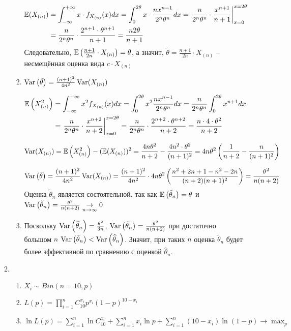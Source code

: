 \begin{enumerate}[resume]
\begin{enumerate}
\begin{enumerate}
\begin{align*}
\operatorname{\mathbb{E}}(X_{(n)}) &= \int_{-\infty}^{+\infty} x \cdot f_{X_{(n)}} (x) dx =  \int_{0}^{2\theta}	x \cdot \frac{nx^{n-1}}{2^n \theta^n} dx = \left. \frac{n}{2^n \theta^n} \cdot \frac{x^{n+1}}{n+1} \right|_{x=0}^{x=2\theta} \\
&= \frac{n}{2^n \theta^n}  \cdot \frac{2^{n+1}\cdot \theta^{n+1}}{n+1} = \frac{n2\theta}{n+1}
\end{align*}
Следовательно, $\operatorname{\mathbb{E}} \left(\frac{n+1}{2n} \cdot X_{(n)}\right) = \theta$, а значит, $\tilde{\theta} = \frac{n+1}{2n} \cdot X_{(n)}$ – несмещённая оценка вида $c \cdot  X_{(n)}$
\item $\operatorname{Var}\left(\tilde{\theta}\right) = \frac{(n+1)^2}{4n^2} \operatorname{Var}(X_{(n)})$

\begin{align*}
\operatorname{\mathbb{E}}\left(X_{(n)}^2\right) &= \int_{-\infty}^{+\infty} x^2 f_{X_{(n)}} (x) dx = \int_{0}^{2\theta} x^2 \frac{nx^{n-1}}{2^n \theta^n}  dx = \frac{n}{2^n \theta^n}  \int_{0}^{2\theta} x^{n+1} dx \\
&= \left. \frac{n}{2^n \theta^n} \cdot \frac{x^{n+2}}{n+2} \right|_{x=0}^{x=2\theta} = \frac{n}{2^n \theta^n} \cdot  \frac{2^{n+2}\cdot \theta^{n+2}}{n+2} = \frac{n\cdot4\cdot\theta^2}{n+2}
\end{align*}

\[
\operatorname{Var}(X_{(n)}) = \operatorname{\mathbb{E}}\left(X_{(n)}^2\right)  - (\operatorname{\mathbb{E}}(X_{(n)}))^2 = \frac{4n\theta^2}{n+2} - \frac{4 n^2 \cdot \theta^2}{(n+1)^2} = 4n\theta^2 \left(\frac{1}{n+2} - \frac{n}{(n+1)^2}\right)
\]

\[
\operatorname{Var}\left(\tilde{\theta}\right) = \frac{(n+1)^2}{4n^2} \operatorname{Var}(X_{(n)}) = \frac{(n+1)^2}{4n^2}  \cdot 4n\theta^2 \left(\frac{n^2+2n+1 - n^2-2n}{(n+2)(n+1)^2} \right) = \frac{\theta^2}{n(n+2)}
\]
Оценка $\tilde{\theta}_n$ является состоятельной, так как
$\operatorname{\mathbb{E}}\left(\tilde{\theta}_n\right) = \theta$ и
$\operatorname{Var}\left(\tilde{\theta}_n\right) = \frac{\theta^2}{n(n+2)} \underset{n \to \infty}{\to} 0$
\item  Поскольку $\operatorname{Var}\left(\widehat{\theta}_n\right) = \frac{\theta^2}{3n}$,
$\operatorname{Var}\left(\tilde{\theta}_n\right) = \frac{\theta^2}{n(n+2)}$ при достаточно большом $n$
$\operatorname{Var}\left(\tilde{\theta}_n\right) < \operatorname{Var}\left(\widehat{\theta}_n\right)$.
Значит, при таких $n$ оценка $\tilde{\theta}_n$ будет более эффективной по сравнению
с оценкой $\widehat{\theta}_n$.
\end{enumerate}

\item
\begin{enumerate}
\item $X_i \sim Bin (n=10, p)$
\item $L(p)  = \prod_{i=1}^{n} C_{10}^{x_i} p^{x_i} (1-p)^{10-x_i}$
\item $\ln L(p) = \sum_{i=1}^{n} \ln C_{10}^{x_i} + \sum_{i=1}^n x_i \ln p + \sum_{i=1}^{n} (10-x_i)\ln (1-p) \to \max_p$


\end{enumerate}
\end{enumerate}
\end{enumerate}
